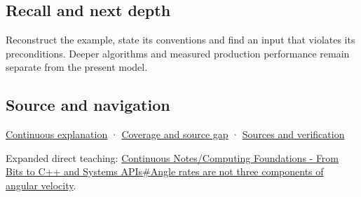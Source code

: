 \subsection{Recall and next depth}\label{appendix-5f723fbd0593-recall-and-next-depth}

Reconstruct the example, state its conventions and find an input that violates its preconditions. Deeper algorithms and measured production performance remain separate from the present model.

\subsection{Source and navigation}\label{appendix-5f723fbd0593-source-and-navigation}

\hyperref[01-foundations-i-ch018-keep-the-promises-visible-while-moving-between-representations]{Continuous explanation} · \hyperref[appendix-fd090d982a15-phase-7---parts-601-700]{Coverage and source gap} · \hyperref[appendix-a103e7846d21-phase-7---source-analysis-and-verification]{Sources and verification}

Expanded direct teaching: \hyperref[01-foundations-i-ch019-angle-rates-are-not-three-components-of-angular-velocity]{Continuous Notes/Computing Foundations - From Bits to C++ and Systems APIs\#Angle rates are not three components of angular velocity}.
